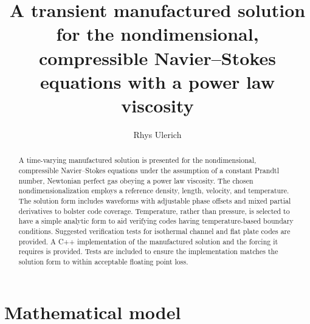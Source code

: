 \documentclass[10pt,reqno]{amsart}
\begin{document}
\title{
    A transient manufactured solution for the nondimensional, compressible
    Navier--Stokes equations with a power law viscosity
}
\author{Rhys Ulerich}

\begin{abstract}
A time-varying manufactured solution is presented for the nondimensional,
compressible Navier--Stokes equations under the assumption of a constant
Prandtl number, Newtonian perfect gas obeying a power law viscosity.  The
chosen nondimensionalization employs a reference density, length, velocity, and
temperature.  The solution form includes waveforms with adjustable phase
offsets and mixed partial derivatives to bolster code coverage.  Temperature,
rather than pressure, is selected to have a simple analytic form to aid
verifying codes having temperature-based boundary conditions.  Suggested
verification tests for isothermal channel and flat plate codes are provided.  A
C++ implementation of the manufactured solution and the forcing it requires is
provided.  Tests are included to ensure the implementation matches the solution
form to within acceptable floating point loss.
\end{abstract}

\maketitle

\section{Mathematical model}
\label{sec:model}
\end{document}
